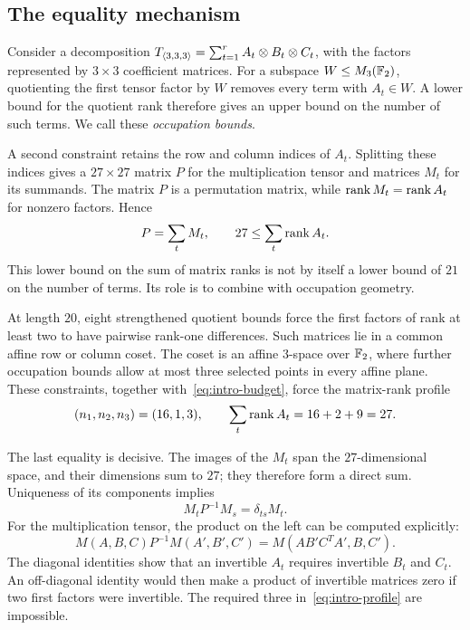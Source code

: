 \subsection{The equality mechanism}
Consider a decomposition
$T_{\langle3,3,3\rangle}=\sum_{t=1}^{r}A_t\otimes B_t\otimes C_t$, with the factors
represented by $3\times3$ coefficient matrices. For a subspace
$W\leq M_3(\mathbb F_2)$, quotienting the first tensor factor by $W$ removes
every term with $A_t\in W$. A lower bound for the quotient rank
therefore gives an upper bound on the number of such terms. We call
these \emph{occupation bounds}.

A second constraint retains the row and column indices of $A_t$.
Splitting these indices gives a $27\times27$ matrix $P$ for the
multiplication tensor and matrices $M_t$ for its summands. The matrix
$P$ is a permutation matrix, while $\operatorname{rank} M_t=\operatorname{rank} A_t$ for
nonzero factors. Hence
\begin{equation}\label{eq:intro-budget}
 P=\sum_tM_t,\qquad 27\leq\sum_t\operatorname{rank} A_t.
\end{equation}
This lower bound on the sum of matrix ranks is not by itself a lower
bound of $21$ on the number of terms. Its role is to combine with
occupation geometry.

At length $20$, eight strengthened quotient bounds force the
first factors of rank at least two to have pairwise rank-one
differences. Such matrices lie in a common affine row or column coset.
The coset is an affine $3$-space over $\mathbb F_2$, where further occupation
bounds allow at most three selected points in every affine plane.
These constraints, together with~\eqref{eq:intro-budget}, force the
matrix-rank profile
\begin{equation}\label{eq:intro-profile}
 (n_1,n_2,n_3)=(16,1,3),\qquad
 \sum_t\operatorname{rank} A_t=16+2+9=27.
\end{equation}

The last equality is decisive. The images of the $M_t$ span the
$27$-dimensional space, and their dimensions sum to $27$; they
therefore form a direct sum. Uniqueness of its components implies
\begin{equation}\label{eq:intro-saturation}
 M_tP^{-1}M_s=\delta_{ts}M_t.
\end{equation}
For the multiplication tensor, the product on the left can be computed
explicitly:
\begin{equation}\label{eq:intro-product}
 M(A,B,C)P^{-1}M(A',B',C')
   =M(AB'C^TA',B,C').
\end{equation}
The diagonal identities show that an invertible $A_t$ requires
invertible $B_t$ and $C_t$. An off-diagonal identity would then make a
product of invertible matrices zero if two first factors were
invertible. The required three in~\eqref{eq:intro-profile} are
impossible.

